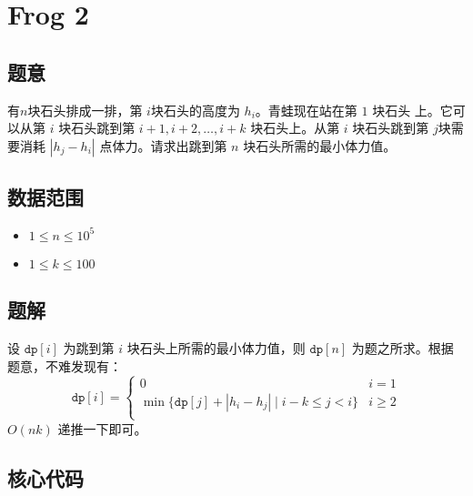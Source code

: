 \section{Frog 2}
\subsection*{题意}
有$n$块石头排成一排，第 $i$块石头的高度为 $h_i$。青蛙现在站在第 $1$ 块石头	上。它可以从第 $i$ 块石头跳到第 $i+1,i+2,\dots,i+k$ 块石头上。从第 $i$ 块石头跳到第 $j$块需要消耗 $|h_j - h_i|$ 点体力。请求出跳到第 $n$ 块石头所需的最小体力值。

\subsection*{数据范围}
\begin{itemize}
\item $1\le n\le 10^5$
\item $1\le k\le 100$
\end{itemize}

\subsection*{题解}

设 ${\texttt{dp}[i]}$ 为跳到第 $i$ 块石头上所需的最小体力值，则 ${\texttt{dp}[n]}$ 为题之所求。根据题意，不难发现有：
\begin{equation*}
{\texttt{dp}[i]} = 
\begin{cases}
 0 & i = 1\\
\min\{{\texttt{dp}[j]} + |h_i-h_j|\mid i-k\le j < i\} & i \ge 2\\
\end{cases}
\end{equation*}
$O(nk)$ 递推一下即可。
\subsection*{核心代码}
\inputminted[linenos,autogobble]{cpp}{./Code/B.cpp}
\newpage
